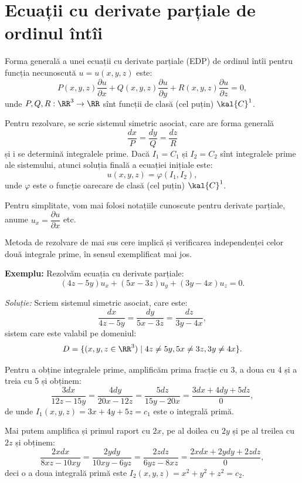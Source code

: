 \chapter{Ecuații cu derivate parțiale de ordinul întîi}
\indent\indent Forma generală a unei ecuații cu derivate parțiale (EDP) de ordinul
întîi pentru funcția necunoscută $ u = u(x, y, z) $ este:
\[
  P(x, y, z) \dfrac{\partial u}{\partial x} + Q(x, y, z) \dfrac{\partial u}{\partial y} + %
  R(x, y, z) \dfrac{\partial u}{\partial z} = 0,
\]
unde $ P, Q, R : \RR^3 \to \RR $ sînt funcții de clasă (cel puțin) $\kal{C}^1$.

Pentru rezolvare, se scrie sistemul simetric asociat, care are forma generală
\[
  \dfrac{dx}{P} = \dfrac{dy}{Q} = \dfrac{dz}{R}
\]
și i se determină integralele prime. Dacă $ I_1 = C_1 $ și $ I_2 = C_2 $ sînt
integralele prime ale sistemului, atunci soluția finală a ecuației inițiale
este:
\[
  u(x, y, z) = \varphi(I_1, I_2),
\]
unde $ \varphi $ este o funcție oarecare de clasă (cel puțin) $\kal{C}^1$.

\begin{remark}\label{rk:not-dp}
  Pentru simplitate, vom mai folosi notațiile cunoscute pentru derivate parțiale,
  anume $ u_x = \dfrac{\partial u}{\partial x} $ etc.
\end{remark}

\begin{remark}\label{rk:int-indep}
  Metoda de rezolvare de mai sus cere implică și verificarea independenței celor
  două integrale prime, în sensul exemplificat mai jos.
\end{remark}

\textbf{Exemplu:} Rezolvăm ecuația cu derivate parțiale:
\[
  (4z - 5y)u_x + (5x - 3z)u_y + (3y - 4x)u_z = 0.
\]

\emph{Soluție:} Scriem sistemul simetric asociat, care este:
\[
  \dfrac{dx}{4z - 5y} = \dfrac{dy}{5x - 3z} = \dfrac{dz}{3y - 4x},
\]
sistem care este valabil pe domeniul:
\[
  D = \{(x, y, z \in \RR^3) \mid 4z \neq 5y, 5x \neq 3z, 3y \neq 4x \}.
\]

Pentru a obține integralele prime, amplificăm prima fracție cu 3, a doua cu 4 și
a treia cu 5 și obținem:
\[
  \dfrac{3dx}{12z - 15y} = \dfrac{4dy}{20x - 12z} = \dfrac{5dz}{15y - 20x} = %
  \dfrac{3dx + 4dy + 5dz}{0},
\]
de unde $ I_1(x, y, z) = 3x + 4y + 5z = c_1 $ este o integrală primă.

Mai putem amplifica și primul raport cu $ 2x $, pe al doilea cu $ 2y $ și
pe al treilea cu $ 2z $ și obținem:
\[
  \dfrac{2xdx}{8xz - 10xy} = \dfrac{2ydy}{10xy - 6yz} = \dfrac{2zdz}{6yz - 8xz} = %
  \dfrac{2xdx + 2ydy + 2zdz}{0},
\]
deci o a doua integrală primă este $ I_2(x, y, z) = x^2 + y^2 + z^2 = c_2 $.

